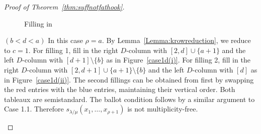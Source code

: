 \begin{proof}[Proof of Theorem~\ref{thm:suffnotfathook}]
\begin{Case}
\begin{figure}[htb]
 \caption[Filling in Case 1.3]{Filling in }
 \label{case1c}
\end{figure}

\end{Case}

\begin{Case}
{ $(b<d<a)$} 
In this case $\rho = a$. By Lemma~\ref{Lemma:krowreduction}, we reduce to $c=1$. For filling 1, fill in the right $D$-column with $[2,d]\cup\{a+1\}$ and the left $D$-column with $[d+1]\setminus\{b\}$ as in Figure~\ref{case1d(i)}. For filling 2, fill in the right $D$-column with $[2,d+1]\cup\{a+1\}\setminus\{b\}$ and the left $D$-column with $[d]$ as in Figure~\ref{case1d(ii)}. The second fillings can be obtained from first by swapping the red entries with the blue entries, maintaining their vertical order. Both tableaux are semistandard. The ballot condition follows by a similar argument to Case 1.1. Therefore $s_{\lambda/\mu}(x_1,\ldots,x_{\rho+1})$ is not multiplicity-free.

\begin{figure}[htb]\centering
 \begin{subfigure}[b]{0.4\textwidth}
\end{subfigure}
\end{figure}
\end{Case}
\end{proof}
